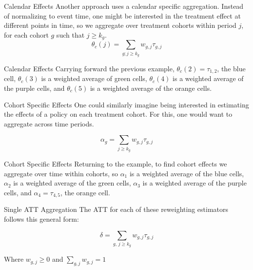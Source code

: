 \documentclass[11pt]{beamer}
\begin{document}
\begin{frame}{Calendar Effects}
    Another approach uses a calendar specific aggregation. Instead of normalizing to event time, one might be interested in the treatment effect at different points in time, so we aggregate over treatment cohorts within period $j$, for each cohort $g$ such that $j \geq k_g$.
    \begin{equation}
        \theta_c(j) = \sum_{g;j \geq k_g} w_{g,j} \tau_{g,j}
    \end{equation}
\end{frame}

\begin{frame}{Calendar Effects}
    Carrying forward the previous example,  $\theta_{c}(2) = \tau_{1,2}$, the blue cell, $\theta_{c}(3)$ is a weighted average of green cells, $\theta_{c}(4)$ is a weighted average of the purple cells, and $\theta_{c}(5)$ is a weighted average of the orange cells.

    
\end{frame}

\begin{frame}{Cohort Specific Effects}
    One could similarly imagine being interested in estimating the effects of a policy on each treatment cohort. For this, one would want to aggregate across time periods. 

    \begin{equation}
        \alpha_g = \sum_{j \geq k_g} w_{g,j} \tau_{g,j}
    \end{equation}
\end{frame}

\begin{frame}{Cohort Specific Effects}
    Returning to the example, to find cohort effects we aggregate over time within cohorts, so $\alpha_1$ is a weighted average of the blue cells, $\alpha_2$ is a weighted average of the green cells, $\alpha_3$ is a weighted average of the purple cells, and $\alpha_4 = \tau_{4,5}$, the orange cell.
    
\end{frame}

\begin{frame}{Single ATT Aggregation}
    The ATT for each of these reweighting estimators follows this general form:

    \begin{equation}\label{eq:delta}
        \delta = \sum_{g,\, j \geq k_g} w_{g,j} \tau_{g,j}
    \end{equation}

    Where $w_{g,j} \geq 0$ and $\sum_{g,j} w_{g,j} = 1$
\end{frame}
\end{document}
